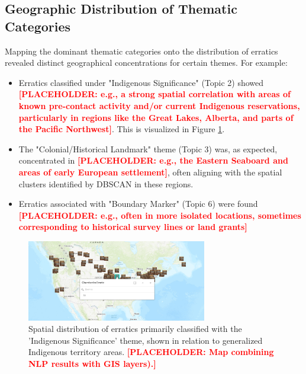 \documentclass[
11pt, %
english, %
singlespacing, %
headsepline, %
]{MastersDoctoralThesis} %
\newcommand{\placeholdertext}[1]{\textcolor{red}{\textbf{[PLACEHOLDER: #1]}}}
\begin{document}
\subsection{Geographic Distribution of Thematic Categories}
\label{subsec:geographic_distribution_themes}
Mapping the dominant thematic categories onto the distribution of erratics revealed distinct geographical concentrations for certain themes. For example:
\begin{itemize}
    \item Erratics classified under "Indigenous Significance" (Topic 2) showed \placeholdertext{e.g., a strong spatial correlation with areas of known pre-contact activity and/or current Indigenous reservations, particularly in regions like the Great Lakes, Alberta, and parts of the Pacific Northwest}. This is visualized in Figure \ref{fig:indigenous_theme_map}.
    \item The "Colonial/Historical Landmark" theme (Topic 3) was, as expected, concentrated in \placeholdertext{e.g., the Eastern Seaboard and areas of early European settlement}, often aligning with the spatial clusters identified by DBSCAN in these regions.
    \item Erratics associated with "Boundary Marker" (Topic 6) were found \placeholdertext{e.g., often in more isolated locations, sometimes corresponding to historical survey lines or land grants}
\end{itemize}

\begin{figure}[H]
    \centering
    \includegraphics[width=0.7\textwidth]{Images/DigitizedMap.png} %
    \caption{Spatial distribution of erratics primarily classified with the 'Indigenous Significance' theme, shown in relation to generalized Indigenous territory areas. \placeholdertext{Map combining NLP results with GIS layers).}}
    \label{fig:indigenous_theme_map}
\end{figure}
\end{document}
